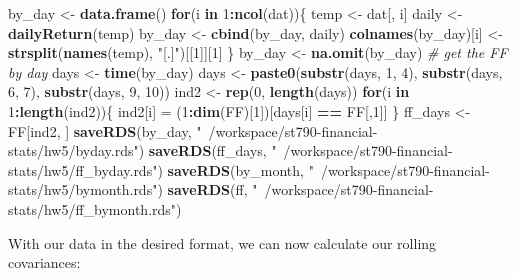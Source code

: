\documentclass[11pt,]{article}
\newenvironment{Shaded}{\begin{snugshade}}{\end{snugshade}}
\newcommand{\CommentTok}[1]{\textcolor[rgb]{0.56,0.35,0.01}{\textit{#1}}}
\newcommand{\ControlFlowTok}[1]{\textcolor[rgb]{0.13,0.29,0.53}{\textbf{#1}}}
\newcommand{\DecValTok}[1]{\textcolor[rgb]{0.00,0.00,0.81}{#1}}
\newcommand{\KeywordTok}[1]{\textcolor[rgb]{0.13,0.29,0.53}{\textbf{#1}}}
\newcommand{\NormalTok}[1]{#1}
\newcommand{\OperatorTok}[1]{\textcolor[rgb]{0.81,0.36,0.00}{\textbf{#1}}}
\newcommand{\StringTok}[1]{\textcolor[rgb]{0.31,0.60,0.02}{#1}}
\begin{document}
\begin{Shaded}
\begin{Highlighting}[]
\NormalTok{by_day <-}\StringTok{ }\KeywordTok{data.frame}\NormalTok{() }
\ControlFlowTok{for}\NormalTok{(i }\ControlFlowTok{in} \DecValTok{1}\OperatorTok{:}\KeywordTok{ncol}\NormalTok{(dat))\{}
\NormalTok{  temp <-}\StringTok{ }\NormalTok{dat[, i]}
\NormalTok{  daily <-}\StringTok{ }\KeywordTok{dailyReturn}\NormalTok{(temp)}
\NormalTok{  by_day <-}\StringTok{ }\KeywordTok{cbind}\NormalTok{(by_day, daily)}
  \KeywordTok{colnames}\NormalTok{(by_day)[i] <-}\StringTok{ }\KeywordTok{strsplit}\NormalTok{(}\KeywordTok{names}\NormalTok{(temp), }\StringTok{"[.]"}\NormalTok{)[[}\DecValTok{1}\NormalTok{]][}\DecValTok{1}\NormalTok{]}
\NormalTok{\}}
\NormalTok{by_day <-}\StringTok{ }\KeywordTok{na.omit}\NormalTok{(by_day)}
\CommentTok{# get the FF by day }
\NormalTok{days <-}\StringTok{ }\KeywordTok{time}\NormalTok{(by_day)}
\NormalTok{days <-}\StringTok{ }\KeywordTok{paste0}\NormalTok{(}\KeywordTok{substr}\NormalTok{(days, }\DecValTok{1}\NormalTok{, }\DecValTok{4}\NormalTok{),}
            \KeywordTok{substr}\NormalTok{(days, }\DecValTok{6}\NormalTok{, }\DecValTok{7}\NormalTok{), }
            \KeywordTok{substr}\NormalTok{(days, }\DecValTok{9}\NormalTok{, }\DecValTok{10}\NormalTok{))}
\NormalTok{ind2 <-}\StringTok{ }\KeywordTok{rep}\NormalTok{(}\DecValTok{0}\NormalTok{, }\KeywordTok{length}\NormalTok{(days))}
\ControlFlowTok{for}\NormalTok{(i }\ControlFlowTok{in} \DecValTok{1}\OperatorTok{:}\KeywordTok{length}\NormalTok{(ind2))\{}
\NormalTok{  ind2[i] =}\StringTok{ }\NormalTok{(}\DecValTok{1}\OperatorTok{:}\KeywordTok{dim}\NormalTok{(FF)[}\DecValTok{1}\NormalTok{])[days[i] }\OperatorTok{==}\StringTok{ }\NormalTok{FF[,}\DecValTok{1}\NormalTok{]]}
\NormalTok{\}}
\NormalTok{ff_days <-}\StringTok{ }\NormalTok{FF[ind2, ]}
\KeywordTok{saveRDS}\NormalTok{(by_day, }\StringTok{"~/workspace/st790-financial-stats/hw5/byday.rds"}\NormalTok{)}
\KeywordTok{saveRDS}\NormalTok{(ff_days, }\StringTok{"~/workspace/st790-financial-stats/hw5/ff_byday.rds"}\NormalTok{)}
\KeywordTok{saveRDS}\NormalTok{(by_month, }\StringTok{"~/workspace/st790-financial-stats/hw5/bymonth.rds"}\NormalTok{)}
\KeywordTok{saveRDS}\NormalTok{(ff, }\StringTok{"~/workspace/st790-financial-stats/hw5/ff_bymonth.rds"}\NormalTok{)}
\end{Highlighting}
\end{Shaded}

With our data in the desired format, we can now calculate our rolling
covariances:
\end{document}
